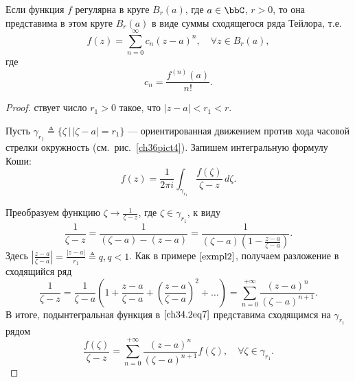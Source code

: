 \begin{thm} \label{abc29}
Если функция $f$ регулярна в круге $B_r(a)$, где $a \in \bbC$, $r > 0$, то она представима в этом круге $B_r(a)$ в виде суммы сходящегося ряда Тейлора, т.е.
\begin{equation} \label{ch34.2eq5}
f(z) = \sum\limits_{n = 0}^{\infty} c_n(z - a)^n, \quad \forall z \in B_r(a),
\end{equation}
где
\begin{equation} \label{ch34.2eq6}
c_n = \frac{f^{(n)}(a)}{n!}.
\end{equation}
\end{thm}
\vspace*{-\baselineskip}
\begin{proof}
ствует число $r_1 > 0$ такое, что $|z - a| < r_1 < r$.

Пусть $\gamma_{r_1} \triangleq \{\zeta \,\big|\, |\zeta - a| = r_1 \}$ — ориентированная движением против хода часовой стрелки окружность (см.~рис.~\ref{ch36pict4}). Запишем интегральную формулу Коши:
\begin{equation} \label{ch34.2eq7}
f(z) = \frac{1}{2 \pi i} \int_{\gamma_{r_1}} \frac{f(\zeta)}{\zeta - z} \,d\zeta.
\end{equation}

\EndInsert
Преобразуем функцию $\zeta \to \frac{1}{\zeta - z}$, где $\zeta \in \gamma_{r_1}$, к виду
$$
\frac{1}{\zeta - z} = \frac{1}{(\zeta - a) - (z - a)} = \frac{1}{(\zeta - a)\left( 1 - \frac{z - a}{\zeta - a}\right)}.
$$
Здесь $\left|\frac{z - a}{\zeta - a} \right| = \frac{|z - a|}{r_1} \triangleq q, q < 1$. Как в примере $\ref{exmpl2}$, получаем разложение в сходящийся ряд
$$
\frac{1}{\zeta - z} = \frac{1}{\zeta - a} \left( 1 + \frac{z - a}{\zeta - a} + \left( \frac{z - a}{\zeta - a}\right)^2 + \ldots \right) = \sum\limits_{n = 0}^{+\infty} \frac{(z - a)^n}{(\zeta - a)^{n + 1}}.
$$
В итоге, подынтегральная функция в $\eqref{ch34.2eq7}$ представима сходящимся на $\gamma_{r_1}$ рядом
\begin{equation} \label{ch34.2eq8}
\frac{f(\zeta)}{\zeta - z} = \sum\limits_{n = 0}^{+\infty} \frac{(z - a)^n}{(\zeta - a)^{n + 1}} f(\zeta), \quad \forall \zeta \in \gamma_{r_1}.
\end{equation}


\end{proof}
